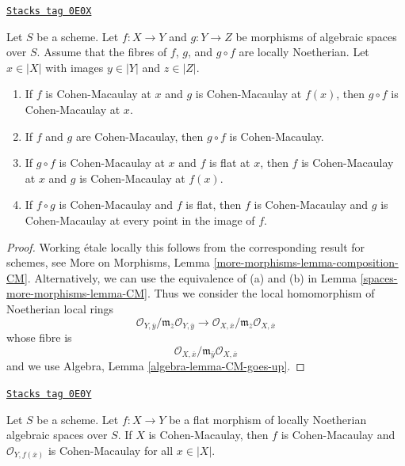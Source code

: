 \begin{lemma}[Composition CM]
\label{spaces-more-morphisms-lemma-composition-CM}
\href{https://stacks.math.columbia.edu/tag/0E0X}{\texttt{Stacks tag 0E0X}}

Let $S$ be a scheme.
Let $f : X \to Y$ and $g : Y \to Z$ be morphisms of algebraic spaces
over $S$. Assume that the
fibres of $f$, $g$, and $g \circ f$ are locally Noetherian.
Let $x \in |X|$ with images $y \in |Y|$ and $z \in |Z|$.
\begin{enumerate}
\item If $f$ is Cohen-Macaulay at $x$ and $g$ is Cohen-Macaulay
at $f(x)$, then $g \circ f$ is Cohen-Macaulay at $x$.
\item If $f$ and $g$ are Cohen-Macaulay, then $g \circ f$ is Cohen-Macaulay.
\item If $g \circ f$ is Cohen-Macaulay at $x$ and $f$ is flat at $x$,
then $f$ is Cohen-Macaulay at $x$ and $g$ is Cohen-Macaulay at $f(x)$.
\item If $f \circ g$ is Cohen-Macaulay and $f$ is flat, then
$f$ is Cohen-Macaulay and $g$ is Cohen-Macaulay at every point in
the image of $f$.
\end{enumerate}
\end{lemma}

\begin{proof}
Working \'etale locally this follows from the corresponding result for
schemes, see
More on Morphisms, Lemma \ref{more-morphisms-lemma-composition-CM}.
Alternatively, we can use the equivalence of (a) and (b) in
Lemma \ref{spaces-more-morphisms-lemma-CM}. Thus we consider the local homomorphism
of Noetherian local rings
$$
\mathcal{O}_{Y, \overline{y}}/
\mathfrak m_{\overline{z}}\mathcal{O}_{Y, \overline{y}}
\longrightarrow
\mathcal{O}_{X, \overline{x}}/
\mathfrak m_{\overline{z}}\mathcal{O}_{X, \overline{x}}
$$
whose fibre is
$$
\mathcal{O}_{X, \overline{x}}/
\mathfrak m_{\overline{y}}\mathcal{O}_{X, \overline{x}}
$$
and we use Algebra, Lemma \ref{algebra-lemma-CM-goes-up}.
\end{proof}

\begin{lemma}
\label{spaces-more-morphisms-lemma-flat-morphism-from-CM}
\href{https://stacks.math.columbia.edu/tag/0E0Y}{\texttt{Stacks tag 0E0Y}}

Let $S$ be a scheme.
Let $f : X \to Y$ be a flat morphism of locally Noetherian
algebraic spaces over $S$.
If $X$ is Cohen-Macaulay, then $f$ is Cohen-Macaulay and
$\mathcal{O}_{Y, f(\overline{x})}$ is Cohen-Macaulay for all $x \in |X|$.
\end{lemma}

